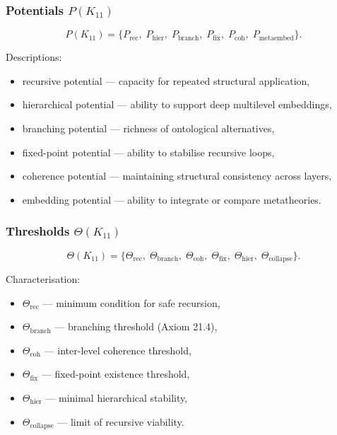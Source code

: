 \subsubsection{Potentials $P(K_{11})$}

\[
P(K_{11})=
\{
P_{\mathrm{rec}},\;
P_{\mathrm{hier}},\;
P_{\mathrm{branch}},\;
P_{\mathrm{fix}},\;
P_{\mathrm{coh}},\;
P_{\mathrm{metaembed}}
\}.
\]

Descriptions:
\begin{itemize}
    \item recursive potential — capacity for repeated structural application,
    \item hierarchical potential — ability to support deep multilevel embeddings,
    \item branching potential — richness of ontological alternatives,
    \item fixed-point potential — ability to stabilise recursive loops,
    \item coherence potential — maintaining structural consistency across layers,
    \item embedding potential — ability to integrate or compare metatheories.
\end{itemize}

\subsubsection{Thresholds $\Theta(K_{11})$}

\[
\Theta(K_{11})=
\{
\Theta_{\mathrm{rec}},\;
\Theta_{\mathrm{branch}},\;
\Theta_{\mathrm{coh}},\;
\Theta_{\mathrm{fix}},\;
\Theta_{\mathrm{hier}},\;
\Theta_{\mathrm{collapse}}
\}.
\]

Characterisation:
\begin{itemize}
    \item $\Theta_{\mathrm{rec}}$ — minimum condition for safe recursion,
    \item $\Theta_{\mathrm{branch}}$ — branching threshold (Axiom 21.4),
    \item $\Theta_{\mathrm{coh}}$ — inter-level coherence threshold,
    \item $\Theta_{\mathrm{fix}}$ — fixed-point existence threshold,
    \item $\Theta_{\mathrm{hier}}$ — minimal hierarchical stability,
    \item $\Theta_{\mathrm{collapse}}$ — limit of recursive viability.
\end{itemize}

